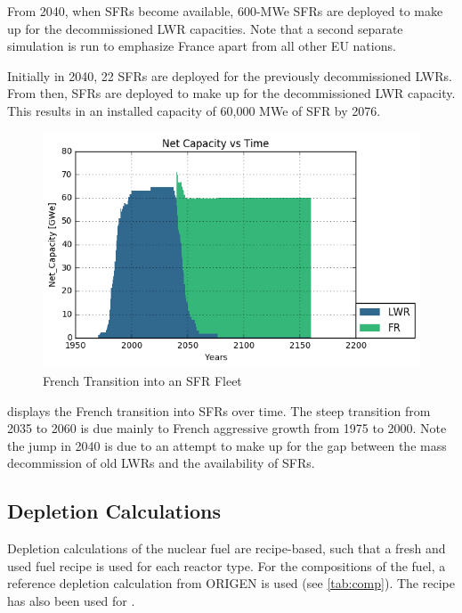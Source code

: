 From 2040, when \gls{SFR}s become available,
600-MWe \gls{SFR}s are deployed to make up for the 
decommissioned \gls{LWR} capacities. Note that a second
separate simulation is run to emphasize France apart from
all other EU nations.

Initially in 2040, 22 \gls{SFR}s
are deployed for the previously decommissioned
\gls{LWR}s. From then, \glspl{SFR} are deployed to
make up for the decommissioned \gls{LWR} capacity.
This results in an installed capacity of 60,000 MWe
of \gls{SFR} by 2076.

\begin{figure}[htbp!]
        \begin{center}
                \includegraphics[scale=0.7]{./images/french-transition/number_plot.png}
        \end{center}
        \caption{French Transition into an SFR Fleet}
        \label{fig:sfr_num}
\end{figure}
\FloatBarrier


 displays
the French transition into \glspl{SFR} over time.
The steep transition from 2035 to 2060 is due mainly to
French aggressive growth from 1975 to 2000. Note the jump in
2040 is due to an attempt to make up for the gap between the
mass decommission of old \glspl{LWR} and the availability
of \glspl{SFR}.



\subsection{Depletion Calculations}
Depletion calculations of the nuclear fuel are recipe-based, such that a fresh 
and used fuel recipe is used for each reactor type.
For the compositions of the fuel, a reference depletion calculation
from ORIGEN is used (see \cref{tab:comp}). The recipe has also been used for
\cite{wilson_adoption_2009}.


